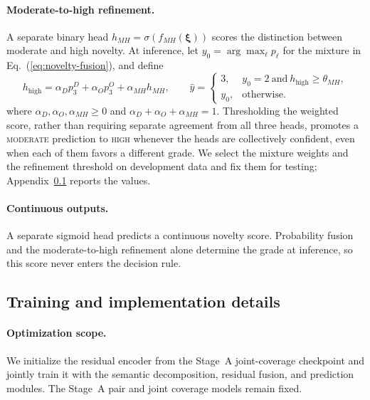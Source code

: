 \paragraph{Moderate-to-high refinement.}
A separate binary head $h_{MH}=\sigma(f_{MH}(\boldsymbol{\xi}))$ scores
the distinction between moderate and high novelty. At inference, let
$y_0=\arg\max_\ell p_\ell$ for the mixture in
Eq.~(\ref{eq:novelty-fusion}), and define
\begin{equation}
 h_{\mathrm{high}}=\alpha_Dp^D_3+\alpha_Op^O_3+\alpha_{MH}h_{MH},\qquad
 \widehat y=
 \begin{cases}
 3,&y_0=2\ \text{and}\ h_{\mathrm{high}}\geq\theta_{MH},\\
 y_0,&\text{otherwise}.
 \end{cases}
\end{equation}
where $\alpha_D,\alpha_O,\alpha_{MH}\geq0$ and
$\alpha_D+\alpha_O+\alpha_{MH}=1$. Thresholding the weighted score, rather
than requiring separate agreement from all three heads, promotes a
\textsc{moderate} prediction to \textsc{high} whenever the heads are
collectively confident, even when each of them favors a different grade. We
select the mixture weights and the refinement threshold on development data
and fix them for testing; Appendix~\ref{app:method-training} reports the
values.

\paragraph{Continuous outputs.}
A separate sigmoid head predicts a continuous novelty score. Probability
fusion and the moderate-to-high refinement alone determine the grade at
inference, so this score never enters the decision rule.

\subsection{Training and implementation details}
\label{app:method-training}

\paragraph{Optimization scope.}
We initialize the residual encoder from the Stage~A joint-coverage checkpoint
and jointly train it with the semantic decomposition, residual fusion, and
prediction modules. The Stage~A pair and joint coverage models remain fixed.

